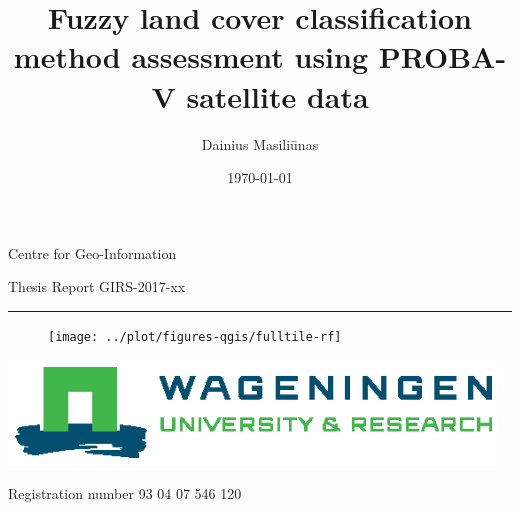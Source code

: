 \documentclass[a4paper,12pt]{scrbook}
\title{Fuzzy land cover classification method assessment using PROBA-V satellite data}
\author{Dainius Masili\=unas}
\date{\today}
\begin{document}

\begin{titlingpage}
  {\Large Centre for Geo-Information}\vspace{0.9cm}
  
  {\Large Thesis Report GIRS-2017-xx}\vspace{0.9cm}
  
  \hrule\vspace{1.1cm}
  
  {\bfseries \Large \MakeUppercase{\thetitle}}\vspace{2.0cm}
  
  \begin{figure}
    \centering
    \texttt{[image: ../plot/figures-qgis/fulltile-rf]}
    \vspace{-110pt}
  \end{figure}
  
  {\Large \theauthor} \vspace{5.9cm}
  
   \vspace{0.5cm}
  
  \includegraphics[width=13cm]{wur-template/WUR_RGB_standard}
  
  \noindent{}
  
  \newpage %
  \thispagestyle{empty}
  
  \centering

  {\bfseries \Large \thetitle} \vspace{2.7cm}
  
  {\Large \theauthor} \vspace{1.1cm}
  
  {Registration number 93 04 07 546 120} \vspace{3.5cm}
  

\end{titlingpage}
\end{document}

